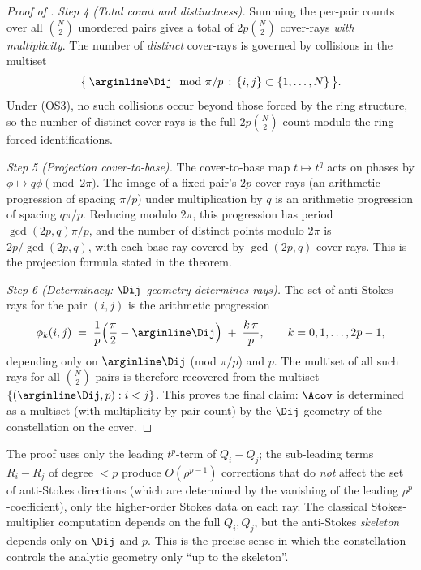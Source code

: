 \begin{proof}[Proof of ]
\smallskip
\textit{Step 4 (Total count and distinctness).}
Summing the per-pair counts over all $\binom{N}{2}$ unordered pairs
gives a total of $2p \binom{N}{2}$ cover-rays \emph{with
multiplicity}. The number of \emph{distinct} cover-rays is governed
by collisions in the multiset
\[
   \big\{\,\arginline \Dij \mod \pi/p \,:\, \{i, j\} \subset
   \{1, \dots, N\}\,\big\}.
\]
Under (OS3), no such collisions occur beyond those forced by the
ring structure, so the number of distinct cover-rays is the full
$2p \binom{N}{2}$ count modulo the ring-forced identifications.

\smallskip
\textit{Step 5 (Projection cover-to-base).}
The cover-to-base map $t \mapsto t^q$ acts on phases by $\phi \mapsto
q\phi \pmod{2\pi}$. The image of a fixed pair's $2p$ cover-rays (an
arithmetic progression of spacing $\pi/p$) under multiplication by
$q$ is an arithmetic progression of spacing $q \pi / p$. Reducing
modulo $2\pi$, this progression has period $\gcd(2p, q) \pi / p$, and
the number of distinct points modulo $2\pi$ is
$2p / \gcd(2p, q)$, with each base-ray covered by $\gcd(2p, q)$
cover-rays. This is the projection formula stated in the theorem.

\smallskip
\textit{Step 6 (Determinacy: $\Dij$-geometry determines rays).}
The set of anti-Stokes rays for the pair $(i, j)$ is the arithmetic
progression
\[
   \phi_k(i, j) \;=\; \frac{1}{p}\Big(\frac{\pi}{2} - \arginline \Dij
   \Big) \;+\; \frac{k\, \pi}{p}, \qquad k = 0, 1, \dots, 2p - 1,
\]
depending only on $\arginline \Dij$ (mod $\pi/p$) and $p$. The
multiset of all such rays for all $\binom{N}{2}$ pairs is therefore
recovered from the multiset $\{(\arginline \Dij, p) : i < j\}$. This
proves the final claim: $\Acov$ is determined as a multiset (with
multiplicity-by-pair-count) by the $\Dij$-geometry of the
constellation on the cover.
\end{proof}

\begin{remark}\label{rem:AT1-subleading}
The proof uses only the leading $t^p$-term of $Q_i - Q_j$; the
sub-leading terms $R_i - R_j$ of degree $< p$ produce $O(\rho^{p-1})$
corrections that do \emph{not} affect the set of anti-Stokes
directions (which are determined by the vanishing of the leading
$\rho^p$-coefficient), only the higher-order Stokes data on each
ray. The classical Stokes-multiplier computation depends on the full
$Q_i, Q_j$, but the anti-Stokes \emph{skeleton} depends only on
$\Dij$ and $p$. This is the precise sense in which the constellation
controls the analytic geometry only ``up to the skeleton''.
\end{remark}

